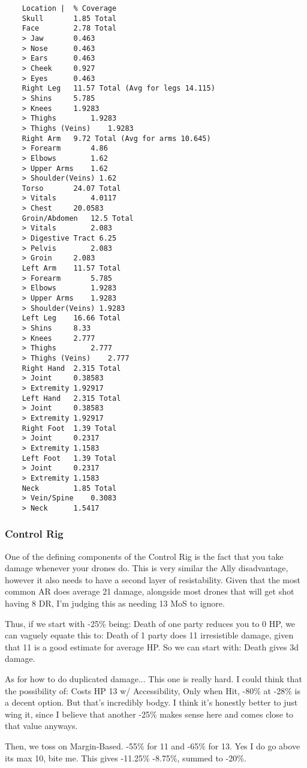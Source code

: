 \begin{multicols*}{2}
	\begin{verbatim}
	Location |	% Coverage
	Skull		1.85 Total
	Face		2.78 Total
	> Jaw		0.463
	> Nose		0.463
	> Ears		0.463
	> Cheek		0.927
	> Eyes		0.463
	Right Leg	11.57 Total (Avg for legs 14.115)
	> Shins		5.785
	> Knees		1.9283
	> Thighs		1.9283
	> Thighs (Veins)	1.9283
	Right Arm	9.72 Total (Avg for arms 10.645)
	> Forearm		4.86
	> Elbows		1.62
	> Upper Arms	1.62
	> Shoulder(Veins) 1.62
	Torso		24.07 Total
	> Vitals		4.0117
	> Chest		20.0583
	Groin/Abdomen	12.5 Total
	> Vitals		2.083
	> Digestive Tract 6.25
	> Pelvis		2.083
	> Groin		2.083
	Left Arm	11.57 Total
	> Forearm		5.785
	> Elbows		1.9283
	> Upper Arms	1.9283
	> Shoulder(Veins) 1.9283
	Left Leg	16.66 Total
	> Shins		8.33
	> Knees		2.777
	> Thighs		2.777
	> Thighs (Veins)	2.777
	Right Hand	2.315 Total
	> Joint		0.38583
	> Extremity	1.92917
	Left Hand	2.315 Total
	> Joint		0.38583
	> Extremity	1.92917
	Right Foot	1.39 Total
	> Joint		0.2317
	> Extremity	1.1583
	Left Foot	1.39 Total
	> Joint		0.2317
	> Extremity	1.1583
	Neck		1.85 Total
	> Vein/Spine	0.3083
	> Neck		1.5417
	\end{verbatim}
	
	
	\subsubsection{Control Rig}\label{bts_riggers}
	
	One of the defining components of the Control Rig is the fact that you take damage whenever your drones do. This is very similar the Ally disadvantage, however it also needs to have a second layer of resistability. Given that the most common AR does average 21 damage, alongside most drones that will get shot having 8 DR, I'm judging this as needing 13 MoS to ignore.
	
	Thus, if we start with -25\% being: Death of one party reduces you to 0 HP, we can vaguely equate this to: Death of 1 party does 11 irresistible damage, given that 11 is a good estimate for average HP. So we can start with: Death gives 3d damage.
	
	As for how to do duplicated damage... This one is really hard. I could think that the possibility of: Costs HP 13 w/ Accessibility, Only when Hit, -80\% at -28\% is a decent option. But that's incredibly bodgy. I think it's honestly better to just wing it, since I believe that another -25\% makes sense here and comes close to that value anyways.
	
	Then, we toss on Margin-Based. -55\% for 11 and -65\% for 13. Yes I do go above its max 10, bite me. This gives -11.25\% -8.75\%, summed to -20\%.
	

\end{multicols*}
